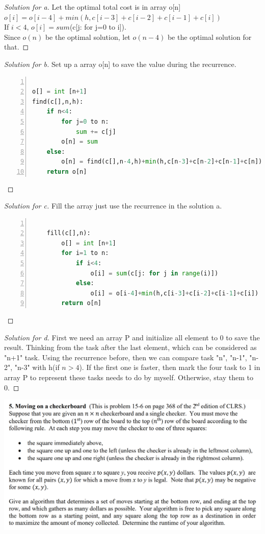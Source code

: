 \documentclass[12pt]{article}
\begin{document}
\begin{proof}[Solution for a]
	Let the optimal total cost is in array o[n]\\
	$o[i]=o[i-4]+min(h,c[i-3]+c[i-2]+c[i-1]+c[i])$\\
	If $i<4$, $o[i] = sum$(c[j: for j=0 to i]).\\
	Since $o(n)$ be the optimal solution, let $o(n-4)$ be the optimal solution for that.
\end{proof}
\begin{proof}[Solution for b]
	Set up a array o[n] to save the value during the recurrence.
	\begin{lstlisting}[language={python},numbers=left,numberstyle=\tiny,%frame=shadowbox,  
		rulesepcolor=\color{red!20!green!20!blue!20},  
		keywordstyle=\color{blue!70!black},  
		commentstyle=\color{blue!90!},  
		basicstyle=\ttfamily]  
		
o[] = int [n+1]
find(c[],n,h):
	if n<4:
		for j=0 to n:
			sum += c[j]
		o[n] = sum
	else:
		o[n] = find(c[],n-4,h)+min(h,c[n-3]+c[n-2]+c[n-1]+c[n])
	return o[n]
	\end{lstlisting}
\end{proof}
\begin{proof}[Solution for c]
	Fill the array just use the recurrence in the solution a.
	\begin{lstlisting}[language={python},numbers=left,numberstyle=\tiny,%frame=shadowbox,  
	rulesepcolor=\color{red!20!green!20!blue!20},  
	keywordstyle=\color{blue!70!black},  
	commentstyle=\color{blue!90!},  
	basicstyle=\ttfamily]  
	
	fill(c[],n):
		o[] = int [n+1]
		for i=1 to n:
			if i<4:
				o[i] = sum(c[j: for j in range(i)])
			else:
				o[i] = o[i-4]+min(h,c[i-3]+c[i-2]+c[i-1]+c[i])
		return o[n]
	\end{lstlisting}
\end{proof}
\begin{proof}[Solution for d]
	First we need an array P and initialize all element to 0 to save the result. Thinking from the task after the last element, which can be considered as "n+1" task. Using the recurrence before, then we can compare task "n", "n-1", "n-2", "n-3" with h(if $n>4$). If the first one is faster, then mark the four task to 1 in array P to represent these tasks needs to do by myself. Otherwise, stay them to 0.
\end{proof}
\includegraphics[scale=0.23]{5.png}
\end{document}
